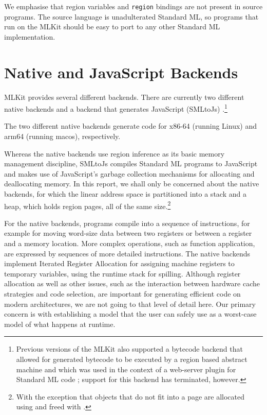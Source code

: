 \documentclass[12pt]{book}
\begin{document}
We emphasise that region variables and \lstinline{region} bindings are not present in
source programs. The source language is unadulterated Standard ML, so programs
that run on the MLKit should be easy to port to any other Standard ML
implementation.


\section{Native and JavaScript Backends}
%
%

MLKit provides several different backends. There are currently two different
native backends and a backend that generates JavaScript (SMLtoJs)
\cite{10.1145/2093328.2093336}.\footnote{Previous versions of the MLKit also
supported a bytecode backend that allowed for generated bytecode to be executed
by a region based abstract machine \cite{kam02} and which was used in the
context of a web-server plugin for Standard ML code \cite{eh03,smlserver07};
support for this backend has terminated, however.}

The two different native backends generate code for x86-64 (running Linux) and
arm64 (running macos), respectively.

Whereas the native backends use region inference as its basic memory management
discipline, SMLtoJs compiles Standard ML programs to JavaScript and makes use of
JavaScript's garbage collection mechanisms for allocating and deallocating
memory. In this report, we shall only be concerned about the native backends,
for which the linear address space is partitioned into a stack and a heap, which
holds region pages, all of the same size.\footnote{With the exception that
objects that do not fit into a page are allocated using  and freed
with .}

For the native backends, programs compile into a sequence of instructions, for
example for moving word-size data between two registers or between a register
and a memory location.  More complex operations, such as function application,
are expressed by sequences of more detailed instructions. The native backends
implement Iterated Register Allocation \cite{appel96} for assigning machine
registers to temporary variables, using the runtime stack for spilling.
Although register allocation as well as other issues, such as the interaction
between hardware cache strategies and code selection, are important for
generating efficient code on modern architectures, we are not going to that
level of detail here. Our primary concern is with establishing a model that the
user can safely use as a worst-case model of what happens at runtime.
\end{document}
